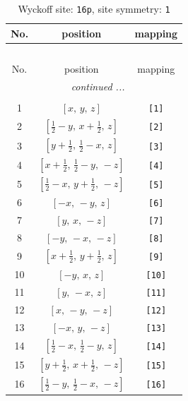 \documentclass[fleqn,8pt]{jsarticle}
\begin{document}
\begin{longtable}{ccc}
\caption{Wyckoff site: {\tt 16p}, site symmetry: {\tt 1}}
 \\
 \hline \hline
No. & position & mapping \\ \hline \endfirsthead

\multicolumn{2}{l}{\tablename\ \thetable{}} \\
 \hline \hline
No. & position & mapping \\ \hline \endhead

 \hline \hline
\multicolumn{2}{r}{\footnotesize\it continued ...} \\ \endfoot

 \hline \hline
\multicolumn{2}{r}{} \\ \endlastfoot

1 & $\left[ x,\, y,\, z \right]$ & {\tt [1]} \\ \hline
2 & $\left[ \frac{1}{2} - y,\, x + \frac{1}{2},\, z \right]$ & {\tt [2]} \\ \hline
3 & $\left[ y + \frac{1}{2},\, \frac{1}{2} - x,\, z \right]$ & {\tt [3]} \\ \hline
4 & $\left[ x + \frac{1}{2},\, \frac{1}{2} - y,\, - z \right]$ & {\tt [4]} \\ \hline
5 & $\left[ \frac{1}{2} - x,\, y + \frac{1}{2},\, - z \right]$ & {\tt [5]} \\ \hline
6 & $\left[ - x,\, - y,\, z \right]$ & {\tt [6]} \\ \hline
7 & $\left[ y,\, x,\, - z \right]$ & {\tt [7]} \\ \hline
8 & $\left[ - y,\, - x,\, - z \right]$ & {\tt [8]} \\ \hline
9 & $\left[ x + \frac{1}{2},\, y + \frac{1}{2},\, z \right]$ & {\tt [9]} \\ \hline
10 & $\left[ - y,\, x,\, z \right]$ & {\tt [10]} \\ \hline
11 & $\left[ y,\, - x,\, z \right]$ & {\tt [11]} \\ \hline
12 & $\left[ x,\, - y,\, - z \right]$ & {\tt [12]} \\ \hline
13 & $\left[ - x,\, y,\, - z \right]$ & {\tt [13]} \\ \hline
14 & $\left[ \frac{1}{2} - x,\, \frac{1}{2} - y,\, z \right]$ & {\tt [14]} \\ \hline
15 & $\left[ y + \frac{1}{2},\, x + \frac{1}{2},\, - z \right]$ & {\tt [15]} \\ \hline
16 & $\left[ \frac{1}{2} - y,\, \frac{1}{2} - x,\, - z \right]$ & {\tt [16]} \\
\end{longtable}
\end{document}
